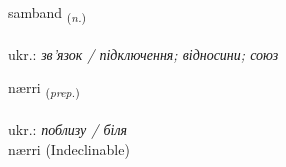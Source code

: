\documentclass[frontgrid, backgrid]{flacards}\usepackage[]{graphicx}\usepackage[]{xcolor}
\begin{document}
\renewcommand{\flhead}{\vskip5pt \fboxsep=0pt {\small\bfseries\footnotesize Nafnorð | іменник}}
\renewcommand{\fcfoot}{\vskip5pt \fboxsep=0pt \hspace{2pt}{\small\bfseries\footnotesize 1K}}

\renewcommand{\blhead}{\vskip5pt {\small\bfseries\footnotesize Nafnorð | іменник }}
\renewcommand{\bcfoot}{\vskip5pt \hspace{2pt}{\small\bfseries\footnotesize 1K}}


{samband \small{\textsubscript{(\textit{n.})}} \\[1ex] %
\textphonetic{[sampant]} \\
ukr.: \emph{зв'язок / підключення; відносини; союз} \\  [2ex]
\renewcommand*{\arraystretch}{0.8}
}


\renewcommand{\flhead}{\vskip5pt \fboxsep=0pt {\small\bfseries\footnotesize Forsetning | прийменник}}
\renewcommand{\fcfoot}{\vskip5pt \fboxsep=0pt \hspace{2pt}{\small\bfseries\footnotesize 1K}}

\renewcommand{\blhead}{\vskip5pt {\small\bfseries\footnotesize Forsetning | прийменник }}
\renewcommand{\bcfoot}{\vskip5pt \hspace{2pt}{\small\bfseries\footnotesize 1K}}


{nærri \small{\textsubscript{(\textit{prep.})}} \\[1ex]
\textphonetic{[nairɪ]} \\
ukr.: \emph{поблизу / біля} \\  [2ex]
nærri (Indeclinable)}

\renewcommand{\flhead}{\vskip5pt \fboxsep=0pt {\small\bfseries\footnotesize Nafnorð | іменник}}
\renewcommand{\fcfoot}{\vskip5pt \fboxsep=0pt \hspace{2pt}{\small\bfseries\footnotesize 1K}}
\end{document}
